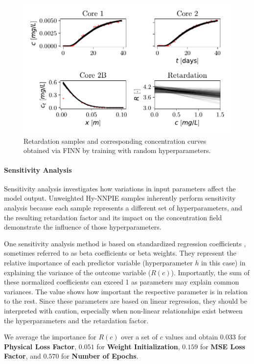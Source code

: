 \begin{figure}[h]
    \centering
    \includegraphics{figs/finn_span_samples.pdf}
    \caption{Retardation samples and corresponding concentration curves obtained via FINN by training with random hyperparameters.}
    \label{fig:span_samples}
\end{figure}



\paragraph{Sensitivity Analysis}
\label{sec:sensitivity}
Sensitivity analysis investigates how variations in input parameters affect the model output. Unweighted Hy-NNPIE samples inherently perform sensitivity analysis because each sample represents a different set of hyperparameters, and the resulting retardation factor and its impact on the concentration field demonstrate the influence of those hyperparameters.

One sensitivity analysis method is based on standardized regression coefficients \cite{menard2004standardized}, sometimes referred to as beta coefficients or beta weights. They represent the relative importance of each predictor variable (hyperparameter $h$ in this case) in explaining the variance of the outcome variable ($R(c)$).
Importantly, the sum of these normalized coefficients can exceed 1 as parameters may explain common variances. The value shows how important the respective parameter is in relation to the rest.
Since these parameters are based on linear regression, they should be interpreted with caution, especially when non-linear relationships exist between the hyperparameters and the retardation factor.

We average the importance for $R(c)$ over a set of $c$ values and obtain $0.033$ for \textbf{Physical Loss Factor}, $0.051$ for \textbf{Weight Initialization}, $0.159$ for \textbf{MSE Loss Factor}, and $0.570$ for \textbf{Number of Epochs}.

